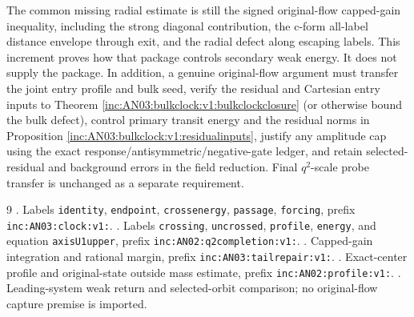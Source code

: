 \documentclass[11pt]{article}
\theoremstyle{remark}\newtheorem{remark}[theorem]{Remark}
\begin{document}
The common missing radial estimate is still the signed original-flow capped-gain inequality, including the strong diagonal contribution, the c-form all-label distance envelope through exit, and the radial defect along escaping labels. This increment proves how that package controls secondary weak energy. It does not supply the package. In addition, a genuine original-flow argument must transfer the joint entry profile and bulk seed, verify the residual and Cartesian entry inputs to Theorem \ref{inc:AN03:bulkclock:v1:bulkclockclosure} (or otherwise bound the bulk defect), control primary transit energy and the residual norms in Proposition \ref{inc:AN03:bulkclock:v1:residualinputs}, justify any amplitude cap using the exact response/antisymmetric/negative-gate ledger, and retain selected-residual and background errors in the field reduction. Final $q^2$-scale probe transfer is unchanged as a separate requirement.

\begin{thebibliography}{9}\small
{}. Labels \texttt{identity}, \texttt{endpoint}, \texttt{crossenergy}, \texttt{passage}, \texttt{forcing}, prefix \texttt{inc:AN03:clock:v1:}.
. Labels \texttt{crossing}, \texttt{uncrossed}, \texttt{profile}, \texttt{energy}, and equation \texttt{axisU1upper}, prefix \texttt{inc:AN02:q2completion:v1:}.
. Capped-gain integration and rational margin, prefix \texttt{inc:AN03:tailrepair:v1:}.
. Exact-center profile and original-state outside mass estimate, prefix \texttt{inc:AN02:profile:v1:}.
. Leading-system weak return and selected-orbit comparison; no original-flow capture premise is imported.
\end{thebibliography}
\end{document}
